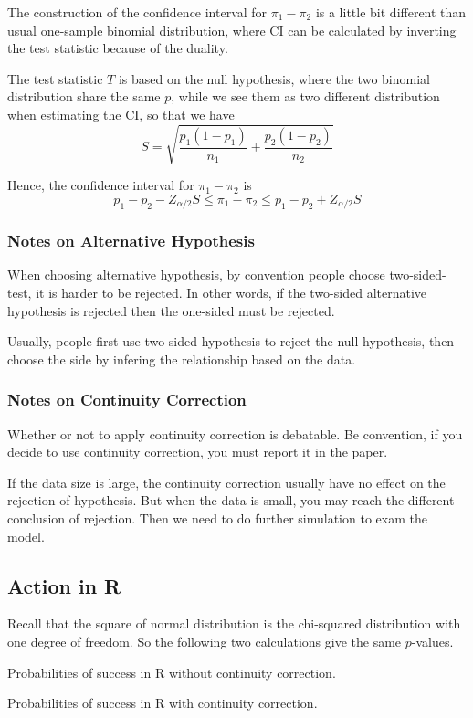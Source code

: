 The construction of the confidence interval for $\pi_1 - \pi_2$ is a little bit different than usual one-sample binomial distribution, where CI can be calculated by inverting the test statistic because of the duality.

The test statistic $T$ is based on the null hypothesis, where the two binomial distribution share the same $p$, while we see them as two different distribution when estimating the CI, so that we have
\[S = \sqrt{\frac{p_1(1-p_1)}{n_1} + \frac{p_2(1-p_2)}{n_2}}\]

Hence, the confidence interval for $\pi_1 - \pi_2$ is
\[p_1 - p_2 - Z_{\alpha/2} S \le \pi_1 - \pi_2 \le p_1 - p_2 + Z_{\alpha/2} S\]

\subsubsection{Notes on Alternative Hypothesis}
When choosing alternative hypothesis, by convention people choose two-sided-test, it is harder to be rejected. In other words, if the two-sided alternative hypothesis is rejected then the one-sided must be rejected.

Usually, people first use two-sided hypothesis to reject the null hypothesis, then choose the side by infering the relationship based on the data.

\subsubsection{Notes on Continuity Correction}
Whether or not to apply continuity correction is debatable. Be convention, if you decide to use continuity correction, you must report it in the paper.

If the data size is large, the continuity correction usually have no effect on the rejection of hypothesis. But when the data is small, you may reach the different conclusion of rejection. Then we need to do further simulation to exam the model.

\subsection{Action in R}
Recall that the square of normal distribution is the chi-squared distribution with one degree of freedom. So the following two calculations give the same $p$-values.



Probabilities of success in R without continuity correction.

Probabilities of success in R with continuity correction.
